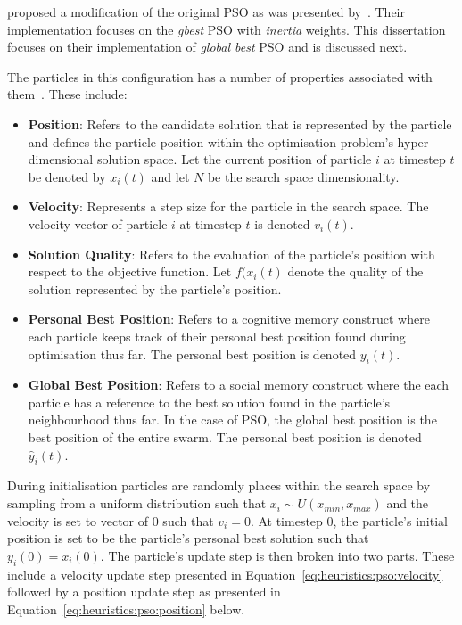 \citeauthor{ref:shi:1998}\cite{ref:shi:1998} proposed a modification of the original \ac{PSO} as was presented by~\citeauthor{ref:kennedy:1995}. Their implementation focuses on the \textit{gbest} \ac{PSO} with \textit{inertia} weights. This dissertation focuses on their implementation of \textit{global best} \ac{PSO} and is discussed next.

The particles in this configuration has a number of properties associated with them~\cite{ref:vanwyk:2014}. These include:

\begin{itemize}
      \item \textbf{Position}: Refers to the candidate solution that is represented by the particle and defines the particle position within the optimisation problem's hyper-dimensional solution space. Let the current position of particle $i$ at timestep $t$ be denoted by $x_{i}(t)$ and let $N$ be the search space dimensionality.
      \item \textbf{Velocity}: Represents a step size for the particle in the search space. The velocity vector of particle $i$ at timestep $t$ is denoted $v_{i}(t)$.
      \item \textbf{Solution Quality}: Refers to the evaluation of the particle's position with respect to the objective function. Let $f(x_{i}(t)$ denote the quality of the solution represented by the particle's position.
      \item \textbf{Personal Best Position}: Refers to a cognitive memory construct where each particle keeps track of their personal best position found during optimisation thus far. The personal best position is denoted $y_{i}(t)$.
      \item \textbf{Global Best Position}: Refers to a social memory construct where the each particle has a reference to the best solution found in the particle's neighbourhood thus far. In the case of  \ac{PSO}, the global best position is the best position of the entire swarm. The personal best position is denoted $\hat{y}_{i}(t)$.
\end{itemize}

During initialisation particles are randomly places within the search space by sampling from a uniform distribution such that $x_{i} \sim U(x_{min}, x_{max})$ and the velocity is set to vector of 0 such that $v_{i} = 0$. At timestep 0, the particle's initial position is set to be the particle's personal best solution such that $y_{i}(0) = x_{i}(0)$. The particle's update step is then broken into two parts. These include a velocity update step presented in Equation~\ref{eq:heuristics:pso:velocity} followed by a position update step as presented in Equation~\ref{eq:heuristics:pso:position} below.

